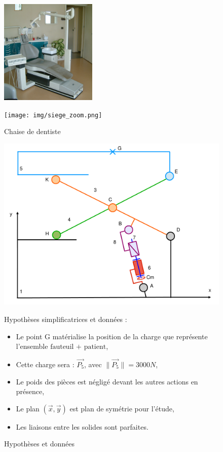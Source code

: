 \begin{figure}[!h]
 \begin{minipage}{0.45\linewidth}
 \centering\includegraphics[height=50mm]{img/siege.png}
 \end{minipage}
 \hfill
 \begin{minipage}{0.45\linewidth}
 \centering\texttt{[image: img/siege\_zoom.png]}
 \end{minipage}
 \caption{Chaise de dentiste}
\end{figure}

\begin{figure}[!h]
 \begin{minipage}{0.55\linewidth}
 \centering\includegraphics[width=\linewidth]{img/chaise_cin.pdf}
 \end{minipage}
 \hfill
 \begin{minipage}{0.48\linewidth}
\small Hypothèses simplificatrices et données : 
 \begin{itemize}
  \item Le point G matérialise la position de la charge que représente l'ensemble $\text{fauteuil + patient}$,
  \item Cette charge sera : $\overrightarrow{P_5}$, avec $\|\overrightarrow{P_5}\|=3000N$,
  \item Le poids des pièces est négligé devant les autres actions en présence,
  \item Le plan $(\overrightarrow{x},\overrightarrow{y})$ est plan de symétrie pour l'étude,
  \item Les liaisons entre les solides sont parfaites.
 \end{itemize}
 \end{minipage}
 \label{chaise_cin}
 \caption{Hypothèses et données}
\end{figure}

